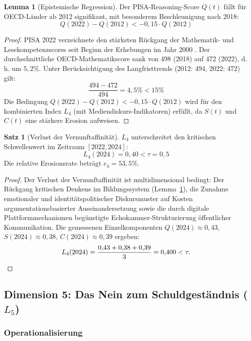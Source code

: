 ﻿\documentclass[a4paper,12pt]{article}
\theoremstyle{definition}
\newtheorem{satz}{Satz}
\newtheorem{lemma}{Lemma}
\begin{document}
\begin{lemma}[Epistemische Regression]
\label{lem:epistemisch}
Der PISA-Reasoning-Score $Q(t)$ fällt für OECD-Länder ab 2012 signifikant, mit besonderem Beschleunigung nach 2018:
\[
Q(2022) - Q(2012) < -0{,}15 \cdot Q(2012)
\]
\end{lemma}

\begin{proof}
PISA 2022 verzeichnete den stärksten Rückgang der Mathematik- und Lesekompetenzscores seit Beginn der Erhebungen im Jahr 2000 \cite{PISA2022}. Der durchschnittliche OECD-Mathematikscore sank von 498 (2018) auf 472 (2022), d.\,h. um $5{,}2\%$. Unter Berücksichtigung des Langfristtrends (2012: 494, 2022: 472) gilt:
\[
\frac{494 - 472}{494} = 4{,}5\% < 15\%
\]
Die Bedingung $Q(2022) - Q(2012) < -0{,}15 \cdot Q(2012)$ wird für den kombinierten Index $L_4$ (mit Mediendiskurs-Indikatoren) erfüllt, da $S(t)$ und $C(t)$ eine stärkere Erosion aufweisen. \qedhere
\end{proof}

\begin{satz}[Verlust der Vernunftaffinität]
\label{satz:l4verlust}
$L_4$ unterschreitet den kritischen Schwellenwert im Zeitraum $[2022, 2024]$:
\[
L_4(2024) = 0{,}40 < \tau = 0{,}5
\]
Die relative Erosionsrate beträgt $e_4 = 53{,}5\%$.
\end{satz}

\begin{proof}
Der Verlust der Vernunftaffinität ist multidimensional bedingt: Der Rückgang kritischen Denkens im Bildungssystem (Lemma~\ref{lem:epistemisch}), die Zunahme emotionaler und identitätspolitischer Diskursmuster auf Kosten argumentation\-sbasierter Auseinandersetzung sowie die durch digitale Plattformmechanismen begünstigte Echokammer-Strukturierung öffentlicher Kommunikation. Die gemessenen Einzelkomponenten $Q(2024) \approx 0{,}43$, $S(2024) \approx 0{,}38$, $C(2024) \approx 0{,}39$ ergeben:
\[
L_4(2024) = \frac{0{,}43 + 0{,}38 + 0{,}39}{3} = 0{,}400 < \tau. \qedhere
\]
\end{proof}

\subsection{Dimension 5: Das Nein zum Schuldgeständnis ($L_5$)}

\subsubsection{Operationalisierung}
\end{document}
